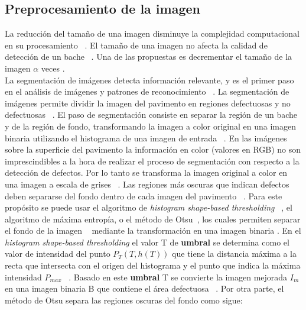 \subsection{Preprocesamiento de la imagen}
La reducción del tamaño de una imagen  disminuye la complejidad computacional en su procesamiento ~. 
El tamaño de una imagen no afecta la calidad de detección de un bache ~. Una de las propuestas 
es decrementar el tamaño de la imagen $\alpha$ veces . \\
La segmentación de imágenes detecta información relevante, y es el primer paso en el análisis de imágenes y patrones
de reconocimiento ~.
La segmentación de imágenes permite  dividir la imagen del pavimento en regiones defectuosas y no defectuosas ~.
El paso de segmentación consiste en separar la región de un bache y de la región de fondo, transformando la imagen a color original 
en una imagen binaria utilizando el histograma de una imagen de entrada ~.
En las imágenes sobre la superficie del pavimento la información en color (valores en RGB) no son imprescindibles a la hora de realizar 
el proceso de segmentación con respecto a la detección de defectos. Por lo tanto se  transforma la imagen original a color en una 
imagen a escala de grises  ~. Las regiones más oscuras que indican defectos deben separarse del fondo 
dentro de cada imagen del pavimento ~. Para este propósito se puede usar el algoritmo de 
\emph{histogram shape-based thresholding} ~, el algoritmo de máxima entropía, o el método de Otsu~, 
los cuales permiten separar el fondo de la imagen ~ mediante la transformación en una imagen binaria . 
En el \emph{histogram shape-based thresholding} el valor T de \textbf{umbral} se determina como el valor de intensidad del punto $P_T(T, h(T))$ que tiene la distancia máxima a la recta 
que intersecta con el origen del histograma y el punto que indica la máxima intensidad $P_{max}$ ~. 
Basado en este \textbf{umbral} T se convierte la imagen mejorada $I_{m}$ en una imagen binaria B que contiene el área defectuosa ~.
Por otra parte, el método de Otsu separa las regiones oscuras del fondo como sigue:

